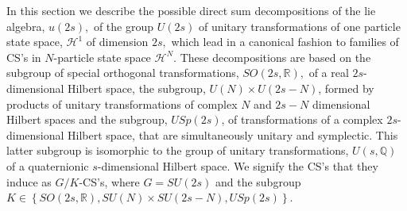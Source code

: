 \documentclass[aps,preprint]{revtex4}%
\begin{document}
In this section we describe the possible direct sum decompositions of the lie
algebra, $u(2s),$ of the group $U(2s)$ of unitary transformations of one
particle state space, $\mathcal{H}^{1}$ of dimension $2s,$ which lead in a
canonical fashion to families of CS's in $N$-particle state space
$\mathcal{H}^{N}$. These decompositions are based on the subgroup of special
orthogonal transformations, $SO\left(  2s,\mathbb{R}\right)  ,$ of a real
$2s$-dimensional Hilbert space, the subgroup, $U\left(  N\right)  \times
U\left(  2s-N\right)  $, formed by products of unitary transformations of
complex $N$ and $2s-N$ dimensional Hilbert spaces and the subgroup,
$USp\left(  2s\right)  $, of transformations of a complex $2s$-dimensional
Hilbert space, that are simultaneously unitary and symplectic. This latter
subgroup is isomorphic to the group of unitary transformations, $U\left(
s,\mathbb{Q}\right)  $ of a quaternionic $s$-dimensional Hilbert space. We
signify the CS's that they induce as $G/K$-CS's, where $G=SU\left(  2s\right)
$ and the subgroup $K\in\left\{  SO\left(  2s,\mathbb{R}\right)  ,SU\left(
N\right)  \times SU\left(  2s-N\right)  ,USp\left(  2s\right)  \right\}  $.
\end{document}
